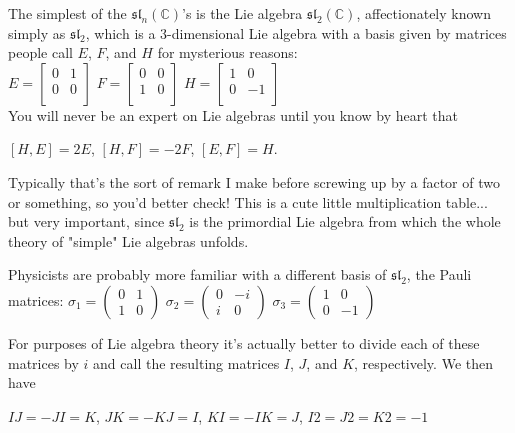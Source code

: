 The simplest of the $\mathfrak{sl}_n(\mathbb{C})$'s is the Lie algebra $\mathfrak{sl}_2(\mathbb{C})$, affectionately known simply as $\mathfrak{sl}_2$, which is a 3-dimensional Lie algebra with a basis given by matrices people call $E$, $F$, and $H$ for mysterious reasons:
\\
$E = \begin{bmatrix}
    0 & 1 \\
    0 & 0 \\
  \end{bmatrix}$
$F =
  \begin{bmatrix}
    0 & 0 \\
    1 & 0 \\
  \end{bmatrix}$
$H = 
  \begin{bmatrix}
    1 & 0 \\
    0 & -1 \\
  \end{bmatrix}$
\\


You will never be an expert on Lie algebras until you know by heart that

$[H,E] = 2E$,    $[H,F] = -2F$,     $[E,F]  = H$.

Typically that's the sort of remark I make before screwing up by a factor of two or something, so you'd better check! This is a cute little multiplication table... but very important, since $\mathfrak{sl}_2$ is the primordial Lie algebra from which the whole theory of "simple" Lie algebras unfolds.

Physicists are probably more familiar with a different basis of $\mathfrak{sl}_2$, the Pauli matrices: 
$ \sigma_1 = \begin{pmatrix} 
0 & 1 \\
1 & 0 
\end{pmatrix} $
$ \sigma_2 = \begin{pmatrix} 
0 & -i \\
i & 0 
\end{pmatrix} $
$ \sigma_3 = \begin{pmatrix} 
1 & 0 \\
0 & -1 
\end{pmatrix} $

For purposes of Lie algebra theory it's actually better to divide each of these matrices by $i$ and call the resulting matrices $I$, $J$, and $K$, respectively. We then have

$IJ = -JI = K$,	$JK = -KJ = I$, $KI = -IK = J$, $I2 = J2 = K2 = -1$

